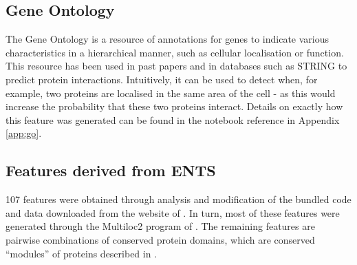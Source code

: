 \subsection{Gene Ontology}
\label{go}

The Gene Ontology\autocite{ashburner_gene_2000} is a resource of annotations for genes to indicate various characteristics in a hierarchical manner, such as cellular localisation or function.
This resource has been used in past papers\autocite{qi_evaluation_2006} and in databases such as \ac{STRING}\autocite{von_mering_string:_2005} to predict protein interactions.
Intuitively, it can be used to detect when, for example, two proteins are localised in the same area of the cell - as this would increase the probability that these two proteins interact.
Details on exactly how this feature was generated can be found in the notebook reference in Appendix \ref{app:go}.

\subsection{Features derived from ENTS}
\label{ents}

107 features were obtained through analysis and modification of the bundled code and data downloaded from the website of \textcite{rodgers-melnick_predicting_2013}.
In turn, most of these features were generated through the Multiloc2 program of \textcite{blum_multiloc2:_2009}.
The remaining features are pairwise combinations of conserved protein domains, which are conserved ``modules'' of proteins described in \textcite{janin_domains_1985}.

